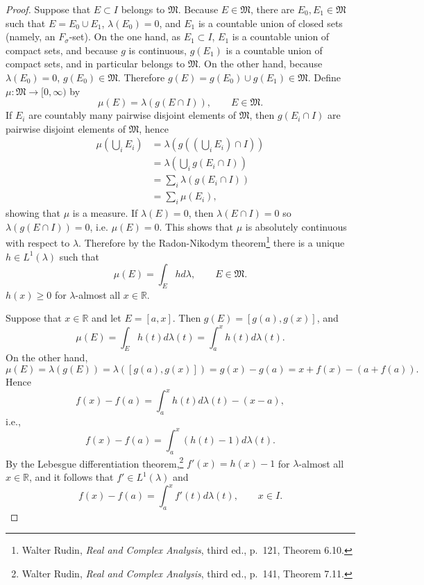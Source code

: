 \documentclass{article}
\theoremstyle{definition}
\begin{document}
\begin{proof}
Suppose that $E \subset I$ belongs to $\mathfrak{M}$. Because
$E \in \mathfrak{M}$, there are  $E_0,E_1 \in \mathfrak{M}$ such that
$E=E_0 \cup E_1$, $\lambda(E_0)=0$, and $E_1$ is a countable union of closed sets (namely, an $F_\sigma$-set).
On the one hand, as $E_1 \subset I$, $E_1$ is a countable union of compact sets, and because
$g$ is continuous, $g(E_1)$ is a countable union of compact sets, and in particular
belongs to $\mathfrak{M}$.
On the other hand, because $\lambda(E_0)=0$, $g(E_0) \in \mathfrak{M}$. Therefore
$g(E) = g(E_0) \cup g(E_1) \in \mathfrak{M}$.
Define
$\mu:\mathfrak{M} \to [0,\infty)$ by
\[
\mu(E) = \lambda(g(E \cap I)), \qquad E \in \mathfrak{M}.
\]
If $E_i$ are countably many pairwise disjoint elements of $\mathfrak{M}$, then
$g(E_i \cap I)$ are pairwise disjoint elements of $\mathfrak{M}$, hence
\begin{align*}
\mu\left(\bigcup_i E_i \right)& = \lambda\left( g\left( \left(\bigcup_i E_i\right) \cap I \right)\right)\\
&= \lambda\left(  \bigcup_i g(E_i \cap I) \right)\\
&= \sum_i \lambda(g(E_i \cap I))\\
&=\sum_i \mu(E_i),
\end{align*}
showing that $\mu$ is a measure. If $\lambda(E)=0$, then 
$\lambda(E \cap I)=0$ so $\lambda(g(E \cap I))=0$, i.e. 
$\mu(E)=0$. This shows that $\mu$ is absolutely continuous with respect to $\lambda$. 
Therefore by the Radon-Nikodym theorem\footnote{Walter Rudin,
{\em Real and Complex Analysis}, third ed., p.~121, Theorem 6.10.} there is a unique
$h \in L^1(\lambda)$ such that
\[
\mu(E) = \int_E h d\lambda, \qquad E \in \mathfrak{M}.
\]
$h(x) \geq 0$ for $\lambda$-almost all $x \in \mathbb{R}$. 

Suppose that $x \in \mathbb{R}$ and let $E=[a,x]$. Then
$g(E)=[g(a),g(x)]$, and 
\[
\mu(E) = \int_E h(t) d\lambda(t) = \int_a^x h(t) d\lambda(t).
\]
On the other hand,
\[
\mu(E) = \lambda(g(E)) = \lambda([g(a),g(x)]) = g(x)-g(a) = x+f(x)-(a+f(a)).
\]
Hence
\[
f(x)-f(a) = \int_a^x h(t) d\lambda(t)-(x-a),
\]
i.e.,
\[
f(x)-f(a) = \int_a^x (h(t)-1) d\lambda(t).
\]
By the Lebesgue differentiation theorem,\footnote{Walter Rudin, {\em Real and Complex Analysis},
third ed., p.~141, Theorem 7.11.} 
$f'(x) = h(x)-1$ for $\lambda$-almost all $x \in \mathbb{R}$, and it follows that $f' \in L^1(\lambda)$ and
\[
f(x)-f(a) = \int_a^x f'(t) d\lambda(t), \qquad  x \in I.
\]


\end{proof}
\end{document}
